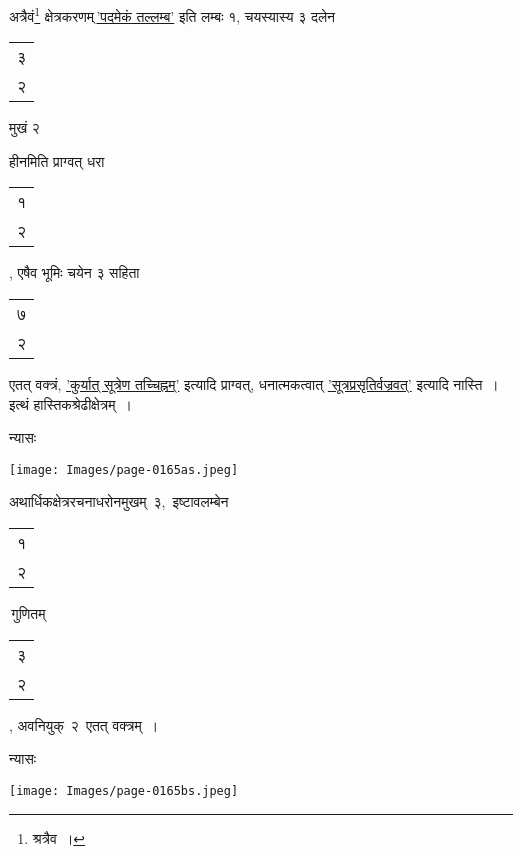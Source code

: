 \documentclass[10pt, openany]{book}
\makeatletter
\newcommand{\devanagarinumeral}[1]{%
	\devanagaridigits{\number \csname c@#1\endcsname}}
\makeatother
\begin{document}
\fancyhead[LE,RO]{\thepage}
\cfoot{}
\renewcommand{\thepage}{\devanagarinumeral{page}}
\setcounter{page}{112}

\renewcommand*{\arraystretch}{0.7}
{अत्रैवं\renewcommand{\thefootnote}{१}\footnote{श्रत्रैव~।} क्षेत्रकरणम्\textendash \,\hyperref[81]{'पदमेकं तल्लम्ब'} इति लम्बः १, चयस्यास्य ३
दलेन\begin{tabular}{c}३\\ २\end{tabular}मुखं २}
{हीनमिति प्राग्वत् धरा\begin{tabular}{c}१\\ २\end{tabular}, एषैव भूमिः चयेन ३ सहिता\begin{tabular}{c}७ \\२ \end{tabular}एतत् वक्त्रं,
\hyperref[81]{'कुर्यात् सूत्रेण तच्चिह्नम्'} इत्यादि प्राग्वत्, धनात्मकत्वात् \hyperref[82]{'सूत्रप्रसृतिर्वज्रवत्'} इत्यादि नास्ति~। इत्थं हास्तिकश्रेढीक्षेत्रम्~।}
\vspace{3mm}

न्यासः\textendash 

\hspace{15mm} \texttt{[image: Images/page-0165as.jpeg]} 
\vspace{3mm}

 {अथार्धिकक्षेत्ररचना\textendash \;धरोनमुखम् \,३, \,इष्टावलम्बेन\,\begin{tabular}{c}१\\ २\end{tabular}\,गुणितम्\,\begin{tabular}{c}३\\ २\end{tabular}, अवनियुक् \,२ \,एतत् वक्त्रम्~।}
\vspace{3mm}

न्यासः\textendash 
\vspace{-3mm}

\hspace{25mm} \texttt{[image: Images/page-0165bs.jpeg]}
\vspace{3mm}
\end{document}

